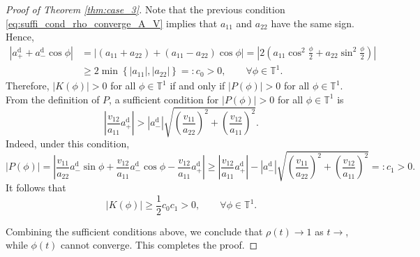 \documentclass[10pt]{article}
\theoremstyle{definition}
\theoremstyle{definition}
\numberwithin{equation}{section}
\newcommand{\BBT}{\mathbb{T}}
\newcommand{\aDPlus}{a_+^{\text{d}}}
\newcommand{\aDMinus}{a_-^{\text{d}}}
\begin{document}
\begin{proof}[Proof of Theorem \ref{thm:case_3}]
Note that the previous condition \eqref{eq:suffi_cond_rho_converge_A_V} implies that $a_{11}$ and $a_{22}$ have the same sign.
Hence,
\begin{equation*}
\begin{aligned}
\left|\aDPlus + \aDMinus \cos \phi \right| &= \left| (a_{11} + a_{22}) + (a_{11} - a_{22}) \cos \phi \right| = \left| 2 \left(a_{11} \cos^2 \frac{\phi}{2} + a_{22} \sin^2 \frac{\phi}{2} \right) \right|\\
&\geq 2 \min \left\{ |a_{11}|, |a_{22}| \right\} =: c_0 > 0, \qquad \forall \phi \in \BBT^1 .
\end{aligned}
\end{equation*}
Therefore, $|K(\phi)| > 0$ for all $\phi \in \BBT^1$ if and only if $|P(\phi)| > 0$ for all $\phi \in \BBT^1$.
From the definition of $P$, a sufficient condition for $|P(\phi)| > 0$ for all $\phi \in \BBT^1$ is
\begin{equation}\label{eq:suffi_cond_phi_not_converge}
\left| \frac{v_{12}}{a_{11}} \aDPlus \right| > |\aDMinus| \sqrt{\left( \frac{v_{11}}{a_{22}} \right)^2 + \left( \frac{v_{12}}{a_{11}} \right)^2} .
\end{equation}
Indeed, under this condition,
\begin{equation*}
|P(\phi)| = \left| \frac{v_{11}}{a_{22}} \aDMinus \sin \phi + \frac{v_{12}}{a_{11}} \aDMinus \cos \phi - \frac{v_{12}}{a_{11}} \aDPlus \right| \geq \left|\frac{v_{12}}{a_{11}} \aDPlus \right| - |\aDMinus| \sqrt{\left( \frac{v_{11}}{a_{22}} \right)^2 + \left( \frac{v_{12}}{a_{11}} \right)^2} =: c_1 > 0 .
\end{equation*}
It follows that
\begin{equation*}
|K(\phi)| \geq \frac{1}{2} c_0 c_1 > 0, \qquad \forall \phi \in \BBT^1 .
\end{equation*}

Combining the sufficient conditions above, we conclude that $\rho(t) \rightarrow 1$ as $t \rightarrow$, while $\phi(t)$ cannot converge.
This completes the proof.
\end{proof}
\end{document}
